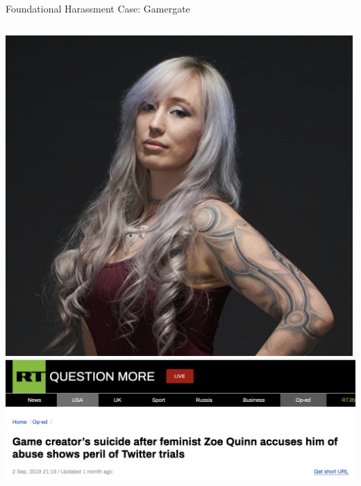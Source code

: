 \documentclass[nobackground,dvipsnames,table]{beamer}
\begin{document}
\begin{frame}{Foundational Harassment Case: Gamergate}
\begin{columns}
\begin{columns}
                    \includegraphics[width=\textwidth]{zoe-quinn}
                    \includegraphics[width=\textwidth]{rt-zoe-quinn}
            \end{columns}
    \end{columns}
\end{frame}
\end{document}

